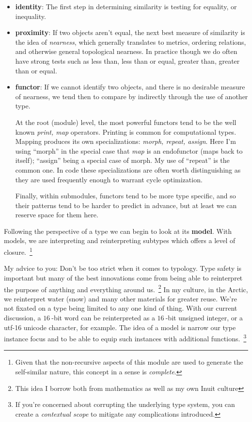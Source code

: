 \documentclass[twoside]{article}
\begin{document}
\begin{itemize}
\item {\bf identity}:	The first step in determining similarity is testing for equality, or inequality.
\item {\bf proximity}:	If two objects aren't equal, the next best measure of similarity is the idea of \emph{nearness},
			which generally translates to metrics, ordering relations, and otherwise general topological
			nearness. In practice though we do often have strong tests such as less than, less than or equal,
			greater than, greater than or equal.
\item {\bf functor}:	If we cannot identify two objects, and there is no desirable measure of nearness, we tend then
			to compare by indirectly through the use of another type. 

			At the root (module) level, the most powerful functors tend to be the well known \emph{print, map}
			operators. Printing is common for computational types. Mapping produces its own specializations:
			\emph{morph, repeat, assign}. Here I'm using ``morph'' in the special case that \emph{map} is an
			endofunctor (maps back to itself); ``assign'' being a special case of morph. My use of ``repeat''
			is the common one. In code these specializations are often worth distinguishing as they are
			used frequently enough to warrant cycle optimization.

			Finally, within submodules, functors tend to be more type specific, and so their patterns tend
			to be harder to predict in advance, but at least we can reserve space for them here.
\end{itemize}

Following the perspective of a type we can begin to look at its {\bf model}. With models, we are interpreting
and reinterpreting subtypes which offers a level of closure.~\footnote{Given that the non-recursive
aspects of this module are used to generate the self-similar nature, this concept in a sense is \emph{complete}.}

My advice to you: Don't be too strict when it comes to typology. Type safety is important but many of the best
innovations come from being able to reinterpret the purpose of anything and everything around us.~\footnote{This idea
I borrow both from mathematics as well as my own Inuit culture} In my culture, in the Arctic, we reinterpret water
(snow) and many other materials for greater reuse. We're not fixated on a type being limited to any one kind of thing.
With our current discussion, a $ 16\ \!\! $-bit word can be reinterpreted as a $ 16\ \!\! $-bit unsigned integer,
or a utf-16 unicode character, for example.  The idea of a model is narrow our type instance focus and to be able
to equip such instances with additional functions.~\footnote{If you're concerned about corrupting the underlying
type system, you can create a \emph{contextual scope} to mitigate any complications introduced.}
\end{document}
